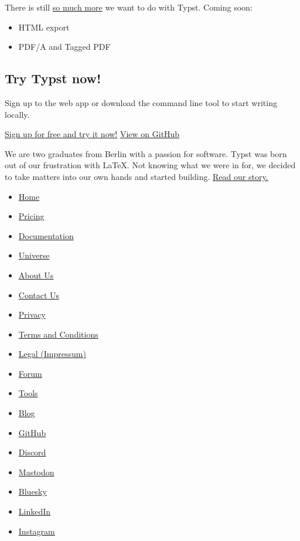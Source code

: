 There is still \href{/docs/roadmap}{so much more} we want to do with
Typst. Coming soon:

\begin{itemize}
\tightlist
\item
  HTML export
\item
  PDF/A and Tagged PDF
\end{itemize}

\label{cta}
\subsection{Try Typst now!}\label{try-typst-now}

Sign up to the web app or download the command line tool to start
writing locally.

\href{/signup}{Sign up for free and try it now!}
\href{https://github.com/typst/typst}{View on GitHub}

\label{mission}
We are two graduates from Berlin with a passion for software. Typst was
born out of our frustration with LaTeX. Not knowing what we were in for,
we decided to take matters into our own hands and started building.
\href{/about/}{Read our story.}

\begin{itemize}
\tightlist
\item
  \href{/\#start}{Home}
\item
  \href{/pricing/}{Pricing}
\item
  \href{/docs/}{Documentation}
\item
  \href{/universe/}{Universe}
\item
  \href{/about/}{About Us}
\item
  \href{/contact/}{Contact Us}
\item
  \href{/privacy/}{Privacy}
\item
  \href{https://typst.app/terms}{Terms and Conditions}
\item
  \href{/legal/}{Legal (Impressum)}
\end{itemize}

\begin{itemize}
\tightlist
\item
  \href{https://forum.typst.app}{Forum}
\item
  \href{/tools/}{Tools}
\item
  \href{/blog/}{Blog}
\item
  \href{https://github.com/typst/}{GitHub}
\item
  \href{https://discord.gg/2uDybryKPe}{Discord}
\item
  \href{https://mastodon.social/@typst}{Mastodon}
\item
  \href{https://bsky.app/profile/typst.app}{Bluesky}
\item
  \href{https://www.linkedin.com/company/typst/}{LinkedIn}
\item
  \href{https://instagram.com/typstapp/}{Instagram}
\end{itemize}

